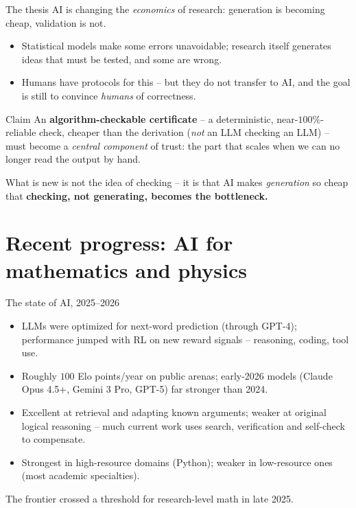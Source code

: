 \documentclass[aspectratio=169,xcolor=dvipsnames]{beamer}
\def\p{\\[0.1in] \pause}
\begin{document}
\begin{frame}{The thesis}
AI is changing the \emph{economics} of research: generation is becoming cheap,
validation is not. \p

\begin{itemize}
  \item Statistical models make some errors unavoidable; research itself generates
        ideas that must be tested, and some are wrong.
  \item Humans have protocols for this -- but they do not transfer to AI, and the
        goal is still to convince \emph{humans} of correctness.
\end{itemize}\pause\medskip

\begin{block}{Claim}
An \textbf{algorithm-checkable certificate} -- a deterministic, near-$100\%$-reliable check,
cheaper than the derivation (\emph{not} an LLM checking an LLM) -- must become a
\emph{central component} of trust: the part that scales when we can no longer read the
output by hand.
\end{block} \pause

\smallskip
What is new is not the idea of checking -- it is that AI makes \emph{generation} so cheap
that \textbf{checking, not generating, becomes the bottleneck.}
\end{frame}

\section{Recent progress: AI for mathematics and physics}
\begin{frame}{The state of AI, 2025--2026}
\begin{itemize}
  \item LLMs were optimized for next-word prediction (through GPT-4); performance jumped
        with RL on new reward signals -- reasoning, coding, tool use.
  \item Roughly $100$ Elo points/year on public arenas; early-2026 models
        (Claude Opus 4.5+, Gemini 3 Pro, GPT-5) far stronger than 2024.
  \item Excellent at retrieval and adapting known arguments; weaker at original logical
        reasoning -- much current work uses search, verification and self-check to compensate.
  \item Strongest in high-resource domains (Python); weaker in low-resource ones
        (most academic specialties).
\end{itemize} \pause
\smallskip
The frontier crossed a threshold for research-level math in late 2025.
\end{frame}
\end{document}
